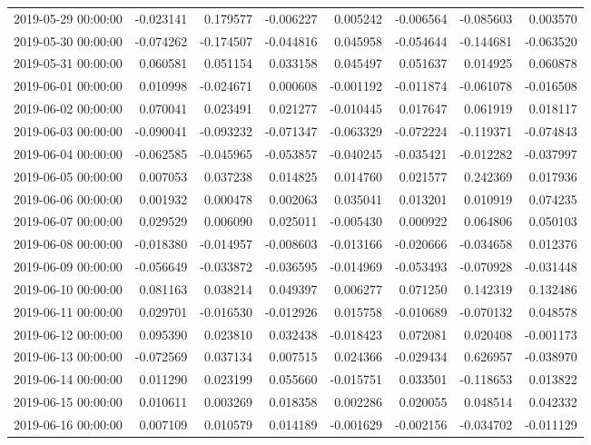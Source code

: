 \begin{tabular}{lrrrrrrr}
2019-05-29 00:00:00 & -0.023141 & 0.179577 & -0.006227 & 0.005242 & -0.006564 & -0.085603 & 0.003570 \\
2019-05-30 00:00:00 & -0.074262 & -0.174507 & -0.044816 & 0.045958 & -0.054644 & -0.144681 & -0.063520 \\
2019-05-31 00:00:00 & 0.060581 & 0.051154 & 0.033158 & 0.045497 & 0.051637 & 0.014925 & 0.060878 \\
2019-06-01 00:00:00 & 0.010998 & -0.024671 & 0.000608 & -0.001192 & -0.011874 & -0.061078 & -0.016508 \\
2019-06-02 00:00:00 & 0.070041 & 0.023491 & 0.021277 & -0.010445 & 0.017647 & 0.061919 & 0.018117 \\
2019-06-03 00:00:00 & -0.090041 & -0.093232 & -0.071347 & -0.063329 & -0.072224 & -0.119371 & -0.074843 \\
2019-06-04 00:00:00 & -0.062585 & -0.045965 & -0.053857 & -0.040245 & -0.035421 & -0.012282 & -0.037997 \\
2019-06-05 00:00:00 & 0.007053 & 0.037238 & 0.014825 & 0.014760 & 0.021577 & 0.242369 & 0.017936 \\
2019-06-06 00:00:00 & 0.001932 & 0.000478 & 0.002063 & 0.035041 & 0.013201 & 0.010919 & 0.074235 \\
2019-06-07 00:00:00 & 0.029529 & 0.006090 & 0.025011 & -0.005430 & 0.000922 & 0.064806 & 0.050103 \\
2019-06-08 00:00:00 & -0.018380 & -0.014957 & -0.008603 & -0.013166 & -0.020666 & -0.034658 & 0.012376 \\
2019-06-09 00:00:00 & -0.056649 & -0.033872 & -0.036595 & -0.014969 & -0.053493 & -0.070928 & -0.031448 \\
2019-06-10 00:00:00 & 0.081163 & 0.038214 & 0.049397 & 0.006277 & 0.071250 & 0.142319 & 0.132486 \\
2019-06-11 00:00:00 & 0.029701 & -0.016530 & -0.012926 & 0.015758 & -0.010689 & -0.070132 & 0.048578 \\
2019-06-12 00:00:00 & 0.095390 & 0.023810 & 0.032438 & -0.018423 & 0.072081 & 0.020408 & -0.001173 \\
2019-06-13 00:00:00 & -0.072569 & 0.037134 & 0.007515 & 0.024366 & -0.029434 & 0.626957 & -0.038970 \\
2019-06-14 00:00:00 & 0.011290 & 0.023199 & 0.055660 & -0.015751 & 0.033501 & -0.118653 & 0.013822 \\
2019-06-15 00:00:00 & 0.010611 & 0.003269 & 0.018358 & 0.002286 & 0.020055 & 0.048514 & 0.042332 \\
2019-06-16 00:00:00 & 0.007109 & 0.010579 & 0.014189 & -0.001629 & -0.002156 & -0.034702 & -0.011129 \\

\end{tabular}
